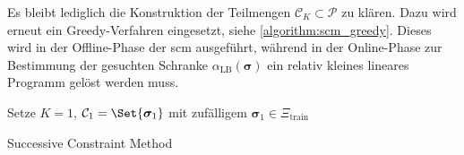 \documentclass[../main.tex]{subfiles}
\begin{document}
Es bleibt lediglich die Konstruktion der Teilmengen $\mathcal C_{K} \subset \mathcal P$ zu klären.
Dazu wird erneut ein Greedy-Verfahren eingesetzt, siehe \cref{algorithm:scm_greedy}.
Dieses wird in der Offline-Phase der \ac{scm} ausgeführt, während in der Online-Phase zur Bestimmung der gesuchten Schranke $\alpha_{\mathrm{LB}}(\bm \sigma)$ ein relativ kleines lineares Programm gelöst werden muss.

\begin{algorithm}[tb]
    \DontPrintSemicolon
    \BlankLine
    Setze $K = 1$, $\mathcal C_{1} = \Set{\bm \sigma_{1}}$ mit zufälligem $\bm \sigma_{1} \in \Xi_{\mathrm{train}}$\;
    \caption{Successive Constraint Method}
    \label{algorithm:scm_greedy}
\end{algorithm}
\end{document}
